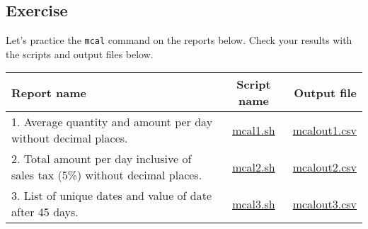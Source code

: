 \subsection{Exercise }

Let's practice the \verb|mcal| command on the reports below. Check your results with the scripts and output files below. 

\begin{table}[htbp]
{\small
\begin{tabular}{ l | c || r }
\hline
\textbf{Report name}   & \textbf{Script name} & \textbf{Output file}  \\
\hline
1. Average quantity and amount per day without decimal places. & \href{exercise/mcal1.sh}{mcal1.sh} & \href{exercise/outdat/mcalout1.csv}{mcalout1.csv} \\
2. Total amount per day inclusive of sales tax (5\%) without decimal places. & \href{exercise/mcal2.sh}{mcal2.sh} & \href{exercise/outdat/mcalout2.csv}{mcalout2.csv} \\
3. List of unique dates and value of date after 45 days.  & \href{exercise/mcal3.sh}{mcal3.sh} & \href{exercise/outdat/mcalout3.csv}{mcalout3.csv} \\



\hline
\end{tabular} 
}
\end{table} 


%
